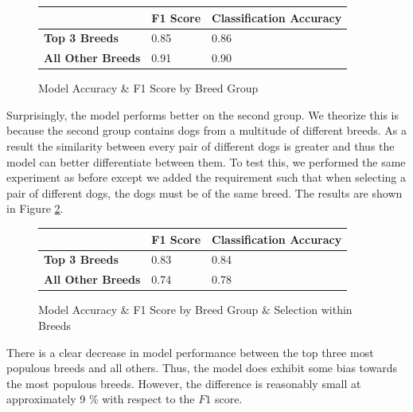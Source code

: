 \documentclass{article}
\begin{document}
\begin{enumerate}
\newpage

\begin{figure}[]

\begin{center}

\begin{tabular}{|l|l|l|}
\hline
                          & \textbf{F1 Score} & \textbf{Classification Accuracy} \\ \hline
\textbf{Top 3 Breeds}     & 0.85        & 0.86              \\ \hline
\textbf{All Other Breeds} & 0.91        & 0.90              \\ \hline
\end{tabular}
\end{center}


\caption{Model Accuracy \& F1 Score by Breed Group}
\label{fig:x breed score}
\end{figure}

\noindent Surprisingly, the model performs better on the second group.  We theorize this is because the second group contains dogs from a multitude of different breeds.   As a result the similarity between every pair of different dogs is greater and thus the model can better differentiate between them.  To test this, we performed the same experiment as before except we added the requirement such that when selecting a pair of different dogs, the dogs must be of the same breed.  The results are shown in Figure \ref{fig:x breed score in breed}.

\begin{figure}[]

\begin{center}

\begin{tabular}{|l|l|l|}
\hline
                          & \textbf{F1 Score} & \textbf{Classification Accuracy} \\ \hline
\textbf{Top 3 Breeds}     & 0.83        & 0.84              \\ \hline
\textbf{All Other Breeds} & 0.74        & 0.78              \\ \hline
\end{tabular}
\end{center}
\caption{Model Accuracy \& F1 Score by Breed Group & Selection within Breeds}
\label{fig:x breed score in breed}
\end{figure}

\noident  There is a clear decrease in model performance between the top three most populous breeds and all others.  Thus, the model does exhibit some bias towards the most populous breeds.  However, the difference is reasonably small at approximately 9 \% with respect to the $F1$ score.




\end{enumerate}
\end{document}
